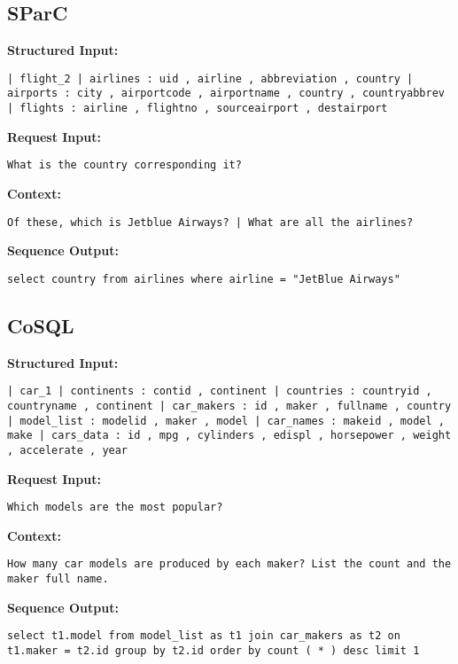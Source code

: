 \documentclass[11pt]{article}
\begin{document}
\subsection{SParC}
\textbf{Structured Input:} 
\begin{lstlisting}
| flight_2 | airlines : uid , airline , abbreviation , country | airports : city , airportcode , airportname , country , countryabbrev | flights : airline , flightno , sourceairport , destairport
\end{lstlisting}
\textbf{Request Input:} 
\begin{lstlisting}
What is the country corresponding it?
\end{lstlisting}
\textbf{Context:} \begin{lstlisting}
Of these, which is Jetblue Airways? | What are all the airlines?
\end{lstlisting}
\textbf{Sequence Output:} 
\begin{lstlisting}
select country from airlines where airline = "JetBlue Airways"
\end{lstlisting}


\subsection{CoSQL}
\textbf{Structured Input:} 
\begin{lstlisting}
| car_1 | continents : contid , continent | countries : countryid , countryname , continent | car_makers : id , maker , fullname , country | model_list : modelid , maker , model | car_names : makeid , model , make | cars_data : id , mpg , cylinders , edispl , horsepower , weight , accelerate , year
\end{lstlisting}
\textbf{Request Input:} 
\begin{lstlisting}
Which models are the most popular?
\end{lstlisting}
\textbf{Context:} \begin{lstlisting}
How many car models are produced by each maker? List the count and the maker full name.
\end{lstlisting}
\textbf{Sequence Output:} 
\begin{lstlisting}
select t1.model from model_list as t1 join car_makers as t2 on t1.maker = t2.id group by t2.id order by count ( * ) desc limit 1
\end{lstlisting}
\end{document}
